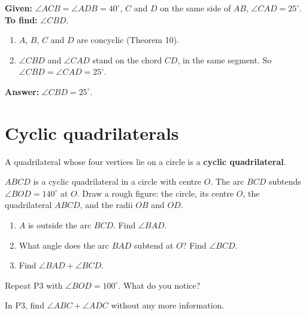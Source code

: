 
\textbf{Given:} $\angle ACB=\angle ADB=40^\circ$, $C$ and $D$ on the same side of $AB$, $\angle CAD=25^\circ$.\\
\textbf{To find:} $\angle CBD$.
\begin{enumerate}[leftmargin=1.8em,itemsep=1pt]
  \item $A$, $B$, $C$ and $D$ are concyclic (Theorem 10).
  \item $\angle CBD$ and $\angle CAD$ stand on the chord $CD$, in the same segment. So $\angle CBD=\angle CAD=25^\circ$.
\end{enumerate}
\textbf{Answer:} $\angle CBD=25^\circ$.

\section{Cyclic quadrilaterals}

A quadrilateral whose four vertices lie on a circle is a \textbf{cyclic quadrilateral}.

\begin{solvefirst}
  \item $ABCD$ is a cyclic quadrilateral in a circle with centre $O$. The arc $BCD$ subtends $\angle BOD=140^\circ$ at $O$. Draw a rough figure: the circle, its centre $O$, the quadrilateral $ABCD$, and the radii $OB$ and $OD$.
  \begin{enumerate}[label=(\alph*),itemsep=1pt]
    \item $A$ is outside the arc $BCD$. Find $\angle BAD$.
    \item What angle does the arc $BAD$ subtend at $O$? Find $\angle BCD$.
    \item Find $\angle BAD+\angle BCD$.
  \end{enumerate}
  \item Repeat P3 with $\angle BOD=100^\circ$. What do you notice?
  \item In P3, find $\angle ABC+\angle ADC$ without any more information.
\end{solvefirst}

